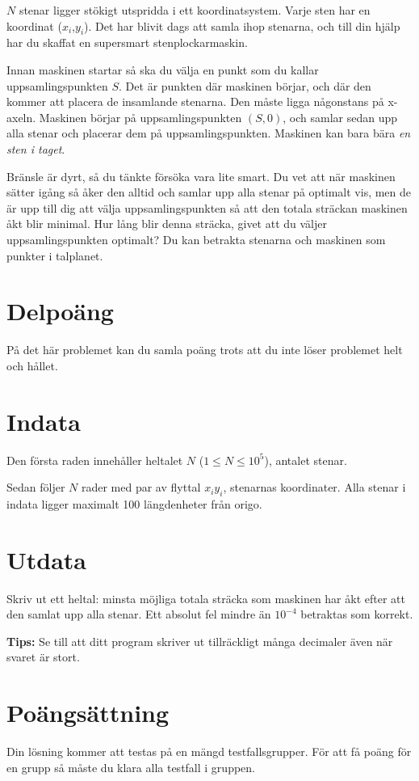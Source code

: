 
$N$ stenar ligger stökigt utspridda i ett koordinatsystem. Varje sten har en koordinat ($x_i$,$y_i$). Det har blivit dags att samla ihop stenarna, och till din hjälp har du skaffat en supersmart stenplockarmaskin.

Innan maskinen startar så ska du välja en punkt som du kallar uppsamlingspunkten $S$. Det är punkten där maskinen börjar, och där den kommer att placera de insamlande stenarna. Den måste ligga någonstans på x-axeln. Maskinen börjar på uppsamlingspunkten $(S,0)$, och samlar sedan upp alla stenar och placerar dem på uppsamlingspunkten. Maskinen kan bara bära \emph{en sten i taget}.

Bränsle är dyrt, så du tänkte försöka vara lite smart. Du vet att när maskinen sätter igång så åker den alltid och samlar upp alla stenar på optimalt vis, men de är upp till dig att välja uppsamlingspunkten så att den totala sträckan maskinen åkt blir minimal. Hur lång blir denna sträcka, givet att du väljer uppsamlingspunkten optimalt? Du kan betrakta stenarna och maskinen som punkter i talplanet.

\section*{Delpoäng}
På det här problemet kan du samla poäng trots att du inte löser problemet helt och hållet.

\section*{Indata}
Den första raden innehåller heltalet $N$ ($1 \leq N \leq 10^5$), antalet stenar.

Sedan följer $N$ rader med par av flyttal $x_i y_i$, stenarnas koordinater. Alla stenar i
indata ligger maximalt 100 längdenheter från origo.

\section*{Utdata}
Skriv ut ett heltal: minsta möjliga totala sträcka som maskinen har åkt efter att den samlat upp alla stenar. Ett absolut fel mindre än $10^{-4}$ betraktas som korrekt.

{\bf Tips:} Se till att ditt program skriver ut tillräckligt många decimaler även när svaret är stort.

\section*{Poängsättning}
Din lösning kommer att testas på en mängd testfallsgrupper.
För att få poäng för en grupp så måste du klara alla testfall i gruppen.

